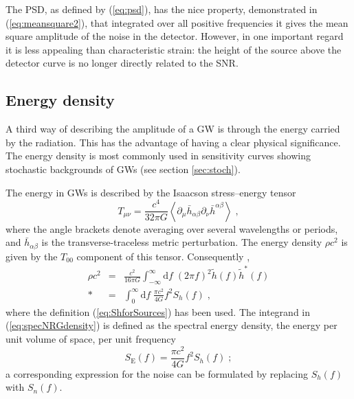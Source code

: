 The PSD, as defined by (\ref{eq:psd}), has the nice property, demonstrated in (\ref{eq:meansquare2}), that integrated over all positive frequencies it gives the mean square amplitude of the noise in the detector. However, in one important regard it is less appealing than characteristic strain: the height of the source above the detector curve is no longer directly related to the SNR.


\subsection{Energy density}\label{sec:energy-density}

A third way of describing the amplitude of a GW is through the energy carried by the radiation. This has the advantage of having a clear physical significance. The energy density is most commonly used in sensitivity curves showing stochastic backgrounds of GWs (see section \ref{sec:stoch}).

The energy in GWs is described by the Isaacson stress--energy tensor \citep[section 35.15]{MTW}
\begin{equation}
T_{\mu\nu}=\frac{c^{4}}{32\pi G}\left<\partial_{\mu}\bar{h}_{\alpha\beta}\partial_{\nu}\bar{h}^{\alpha\beta}\right> \;,
\end{equation}
where the angle brackets denote averaging over several wavelengths or periods, and $\bar{h}_{\alpha\beta}$ is the transverse-traceless metric perturbation. The energy density $\rho c^{2}$ is given by the $T_{00}$ component of this tensor. Consequently \citep[cf.][]{Berry2013},
\begin{eqnarray}
\rho c^{2} &=& \frac{c^{2}}{16\pi G}\int_{-\infty}^{\infty}\mathrm{d}f\;\left(2\pi f\right)^{2}\tilde{h}(f)\tilde{h}^{*}(f) \\*
 &=& \int_{0}^{\infty}\mathrm{d}f\;\frac{\pi c^{2}}{4G}f^{2}S_{h}(f)\; , \label{eq:specNRGdensity}
\end{eqnarray} 
where the definition (\ref{eq:ShforSources}) has been used. The integrand in (\ref{eq:specNRGdensity}) is defined as the spectral energy density, the energy per unit volume of space, per unit frequency \citep{HellingsDowns}
\begin{equation}\label{eq:spectralenergydensity}
S_{\mathrm{E}}(f)=\frac{\pi c^{2}}{4G} f^{2}S_{h}(f) \; ;
\end{equation}
a corresponding expression for the noise can be formulated by replacing $S_h(f)$ with $S_{n}(f)$.


